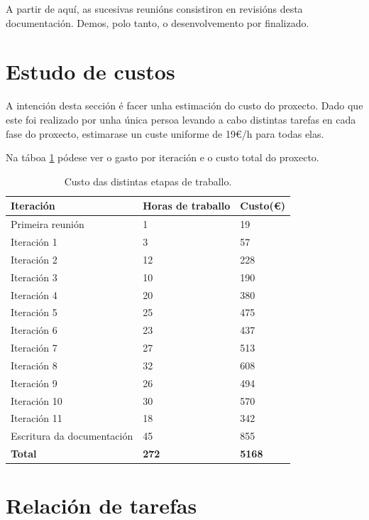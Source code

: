A partir de aquí, as sucesivas reunións consistiron en revisións desta documentación. Demos, polo tanto, o desenvolvemento por finalizado.



\section{Estudo de custos}

A intención desta sección é facer unha estimación do custo do proxecto. Dado que este foi realizado por unha única persoa levando a cabo distintas tarefas en cada fase do proxecto, estimarase un custe uniforme de 19€/h para todas elas. 

Na táboa \ref{tab:custo} pódese ver o gasto por iteración e o custo total do proxecto.

\begin{table}[h]
	\centering
	\begin{tabular}{|p{5cm}|l|l|}
		\hline
		\rowcolor{blue!10}
		Iteración & Horas de traballo & Custo(€)\\
		\hline
		Primeira reunión & 1 &  19\\
		\hline
		Iteración 1 & 3 &  57\\
		\hline
		Iteración 2 & 12 &  228\\
		\hline
		Iteración 3 & 10 &  190\\
		\hline
		Iteración 4 & 20 &  380\\
		\hline
		Iteración 5 & 25 &  475\\
		\hline
		Iteración 6 & 23 &  437\\
		\hline
		Iteración 7 & 27 &  513\\
		\hline
		Iteración 8 & 32 &  608\\
		\hline
		Iteración 9 & 26 &  494\\
		\hline
		Iteración 10 & 30 &  570\\
		\hline
		Iteración 11 &  18 &  342\\
		\hline
		Escritura da documentación & 45 & 855\\
		\hline
		\textbf{Total} & \textbf{272} & \textbf{5168} \\
		\hline
	\end{tabular}
	\caption{Custo das distintas etapas de traballo.}
\label{tab:custo}
\end{table}


\section{Relación de tarefas}


